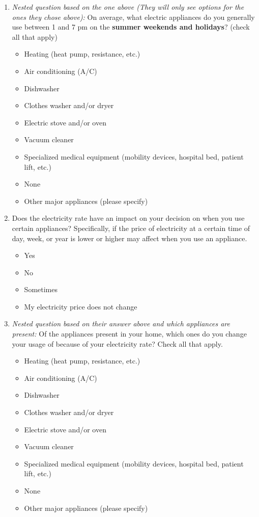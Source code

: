 \documentclass{article}
\begin{document}
\begin{enumerate}
\item \textit{Nested question based on the one above (They will only see options for the ones they chose above):}
On average, what electric appliances do you generally use between 1 and 7 pm on the \textbf{summer weekends and holidays}? (check all that apply)
\begin{itemize}
  \item[\checkbox] Heating (heat pump, resistance, etc.)
  \item[\checkbox] Air conditioning (A/C)
  \item[\checkbox] Dishwasher
  \item[\checkbox] Clothes washer and/or dryer
  \item[\checkbox] Electric stove and/or oven
  \item[\checkbox] Vacuum cleaner
  \item[\checkbox] Specialized medical equipment (mobility devices, hospital bed, patient lift, etc.)
  \item[\checkbox] None
  \item[\checkbox] Other major appliances (please specify)
\end{itemize}
 

\item Does the electricity rate have an impact on your decision on when you use certain appliances? Specifically, if the price of electricity at a certain time of day, week, or year is lower or higher may affect when you use an appliance.
\begin{itemize}
  \item[\checkbox] Yes
  \item[\checkbox] No
  \item[\checkbox] Sometimes
  \item[\checkbox] My electricity price does not change
\end{itemize}
 

\item \textit{Nested question based on their answer above and which appliances are present:}
Of the appliances present in your home, which ones do you change your usage of because of your electricity rate? Check all that apply.
\begin{itemize}
  \item[\checkbox] Heating (heat pump, resistance, etc.)
  \item[\checkbox] Air conditioning (A/C)
  \item[\checkbox] Dishwasher
  \item[\checkbox] Clothes washer and/or dryer
  \item[\checkbox] Electric stove and/or oven
  \item[\checkbox] Vacuum cleaner
  \item[\checkbox] Specialized medical equipment (mobility devices, hospital bed, patient lift, etc.)
  \item[\checkbox] None
  \item[\checkbox] Other major appliances (please specify)
\end{itemize}
 


\end{enumerate}
\end{document}
